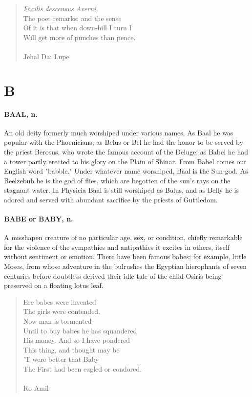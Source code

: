 \documentclass[11pt]{article}
\begin{document}
\begin{quote}   {\em Facilis descensus Averni,} \\
      The poet remarks; and the sense \\
  Of it is that when down-hill I turn I \\
      Will get more of punches than pence. \\
 \\
Jehal Dai Lupe \end{quote}




\section*{B}



\paragraph{BAAL, n.}  An old deity formerly much worshiped under various names.
As Baal he was popular with the Phoenicians; as Belus or Bel he had
the honor to be served by the priest Berosus, who wrote the famous
account of the Deluge; as Babel he had a tower partly erected to his
glory on the Plain of Shinar.  From Babel comes our English word
"babble."  Under whatever name worshiped, Baal is the Sun-god.  As
Beelzebub he is the god of flies, which are begotten of the sun's rays
on the stagnant water.  In Physicia Baal is still worshiped as Bolus,
and as Belly he is adored and served with abundant sacrifice by the
priests of Guttledom.

\paragraph{BABE or BABY, n.}  A misshapen creature of no particular age, sex, or
condition, chiefly remarkable for the violence of the sympathies and
antipathies it excites in others, itself without sentiment or emotion.
There have been famous babes; for example, little Moses, from whose
adventure in the bulrushes the Egyptian hierophants of seven centuries
before doubtless derived their idle tale of the child Osiris being
preserved on a floating lotus leaf.

\begin{quote}           Ere babes were invented \\
          The girls were contended. \\
          Now man is tormented \\
  Until to buy babes he has squandered \\
  His money.  And so I have pondered \\
          This thing, and thought may be \\
          'T were better that Baby \\
  The First had been eagled or condored. \\
 \\
Ro Amil \end{quote}
\end{document}
